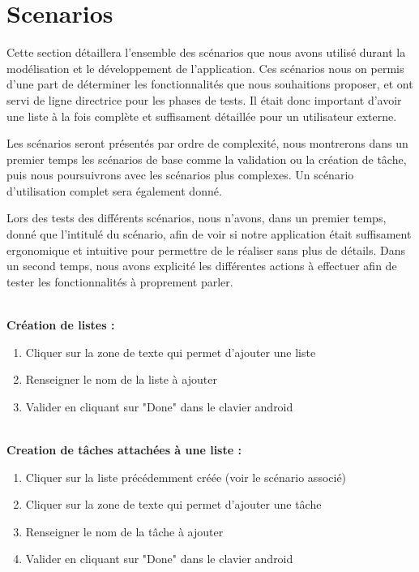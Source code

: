 \documentclass[a4paper, 11pt, french]{report}
\begin{document}
\section{Scenarios} %
Cette section détaillera l'ensemble des scénarios que nous avons utilisé durant la modélisation et le développement de l'application. Ces scénarios nous on permis d'une part de déterminer les fonctionnalités que nous souhaitions proposer, et ont servi de ligne directrice pour les phases de tests. Il était donc important d'avoir une liste à la fois complète et suffisament détaillée pour un utilisateur externe.
\newline

Les scénarios seront présentés par ordre de complexité, nous montrerons dans un premier temps les scénarios de base comme la validation ou la création de tâche, puis nous poursuivrons avec les scénarios plus complexes.
\newline
Un scénario d'utilisation complet sera également donné.
\newline

Lors des tests des différents scénarios, nous n'avons, dans un premier temps, donné que l'intitulé du scénario, afin de voir si notre application était suffisament ergonomique et intuitive pour permettre de le réaliser sans plus de détails. Dans un second temps, nous avons explicité les différentes actions à effectuer afin de tester les fonctionnalités à proprement parler.
\newline

~\\
\textbf{Création de listes :} 
\begin{enumerate}
	\item Cliquer sur la zone de texte qui permet d'ajouter une liste
	\item Renseigner le nom de la liste à ajouter
	\item Valider en cliquant sur "Done" dans le clavier android
\end{enumerate}
~\\
\textbf{Creation de tâches attachées à une liste :} 
\begin{enumerate}
	\item Cliquer sur la liste précédemment créée (voir le scénario associé)
	\item Cliquer sur la zone de texte qui permet d'ajouter une tâche
	\item Renseigner le nom de la tâche à ajouter
	\item Valider en cliquant sur "Done" dans le clavier android
\end{enumerate}
\end{document}
